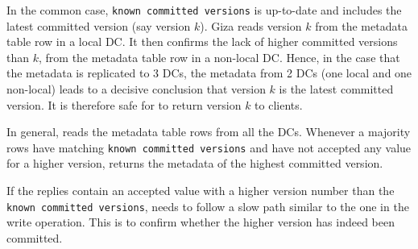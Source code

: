 In the common case, {\tt known committed versions} is up-to-date and
includes the latest committed version (say version $k$).
Giza reads version $k$ from the metadata table row in a local DC.
It then confirms the lack of higher committed versions than $k$,
from the metadata table row in a non-local DC.
Hence, in the case that the metadata is replicated to 3 DCs, 
the metadata from 2 DCs (one local and one non-local) 
leads to a decisive conclusion that version $k$ is the
latest committed version. It is therefore safe for \name to return
version $k$ to clients.

In general, \name reads the metadata table rows from all the DCs.
Whenever a majority rows have matching {\tt known committed versions} and have
not accepted any value for a higher version, \name returns the metadata
of the highest committed version.

If the replies contain an accepted value with a higher version number than the
{\tt known committed versions}, \name needs to follow a slow path
similar to the one in the write operation. This is to confirm whether the higher
version has indeed been committed.

